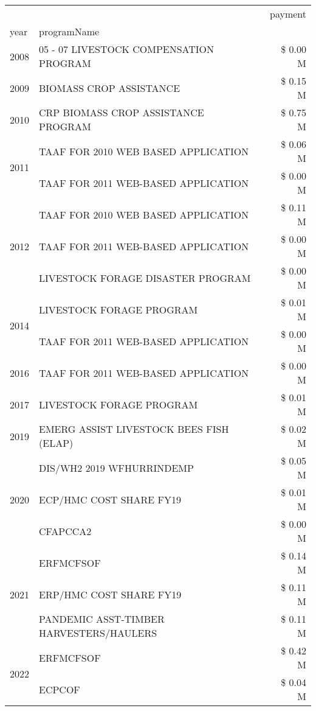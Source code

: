 \begin{tabular}{llr}
\toprule
 &  & payment \\
year & programName &  \\
\midrule
2008 & 05 - 07 LIVESTOCK COMPENSATION PROGRAM & \$ 0.00 M \\
\cline{1-3}
2009 & BIOMASS CROP ASSISTANCE & \$ 0.15 M \\
\cline{1-3}
2010 & CRP BIOMASS CROP ASSISTANCE PROGRAM & \$ 0.75 M \\
\cline{1-3}
\multirow[t]{2}{*}{2011} & TAAF FOR 2010 WEB BASED APPLICATION & \$ 0.06 M \\
 & TAAF FOR 2011 WEB-BASED APPLICATION & \$ 0.00 M \\
\cline{1-3}
\multirow[t]{3}{*}{2012} & TAAF FOR 2010 WEB BASED APPLICATION & \$ 0.11 M \\
 & TAAF FOR 2011 WEB-BASED APPLICATION & \$ 0.00 M \\
 & LIVESTOCK FORAGE DISASTER PROGRAM & \$ 0.00 M \\
\cline{1-3}
\multirow[t]{2}{*}{2014} & LIVESTOCK FORAGE PROGRAM & \$ 0.01 M \\
 & TAAF FOR 2011 WEB-BASED APPLICATION & \$ 0.00 M \\
\cline{1-3}
2016 & TAAF FOR 2011 WEB-BASED APPLICATION & \$ 0.00 M \\
\cline{1-3}
2017 & LIVESTOCK FORAGE PROGRAM & \$ 0.01 M \\
\cline{1-3}
2019 & EMERG ASSIST LIVESTOCK BEES FISH (ELAP) & \$ 0.02 M \\
\cline{1-3}
\multirow[t]{3}{*}{2020} & DIS/WH2 2019 WFHURRINDEMP & \$ 0.05 M \\
 & ECP/HMC COST SHARE FY19 & \$ 0.01 M \\
 & CFAPCCA2 & \$ 0.00 M \\
\cline{1-3}
\multirow[t]{3}{*}{2021} & ERFMCFSOF & \$ 0.14 M \\
 & ERP/HMC COST SHARE FY19 & \$ 0.11 M \\
 & PANDEMIC ASST-TIMBER HARVESTERS/HAULERS & \$ 0.11 M \\
\cline{1-3}
\multirow[t]{2}{*}{2022} & ERFMCFSOF & \$ 0.42 M \\
 & ECPCOF & \$ 0.04 M \\
\cline{1-3}
\bottomrule
\end{tabular}
